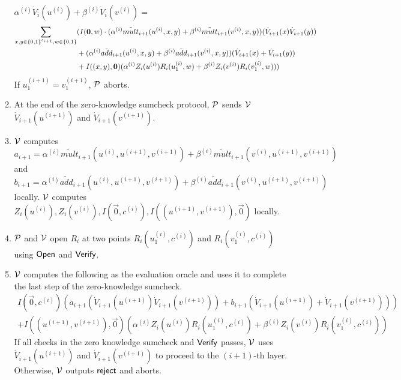 \begin{mdframed}[nobreak=false]
\begin{construction}
\begin{enumerate}
\begin{enumerate}
				$\alpha^{(i)}\dot{V}_i(u^{(i)})+\beta^{(i)}\dot{V}_i(v^{(i)})=$
				\begin{align*}
				\sum_{x, y\in \binary^{s_{i+1}},w \in \binary}&(I(\vec{0},w) \cdot (\alpha^{(i)}\tilde{mult}_{i+1}(u^{(i)}, x, y)+\beta^{(i)}\tilde{mult}_{i+1}(v^{(i)}, x, y))(\dot{V}_{i+1}(x)\dot{V}_{i+1}(y))\\
				&+(\alpha^{(i)}\tilde{add}_{i+1}(u^{(i)}, x, y)+\beta^{(i)}\tilde{add}_{i+1}(v^{(i)}, x, y))(\dot{V}_{i+1}(x)+\dot{V}_{i+1}(y))\nonumber\\
				&+ I((x, y), \vec{0})(\alpha^{(i)}Z_i(u^{(i)})R_i(u_1^{(i)}, w)+\beta^{(i)}Z_i(v^{(i)})R_i(v_1^{(i)}, w)))
				\end{align*}
				If $u_1^{(i+1)} = v_1^{(i+1)}$, $\P$ aborts.
				
				\item At the end of the zero-knowledge sumcheck protocol, $\P$ sends $\V$ $\dot{V}_{i+1}(u^{(i+1)})$ and $\dot{V}_{i+1}(v^{(i+1)})$.
				
				\item $\V$ computes $a_{i+1} = \alpha^{(i)}\tilde{mult}_{i+1}(u^{(i)}, u^{(i+1)}, v^{(i+1)})+\beta^{(i)}\tilde{mult}_{i+1}(v^{(i)}, u^{(i+1)}, v^{(i+1)})$ and $b_{i+1} = \alpha^{(i)}\tilde{add}_{i+1}(u^{(i)}, u^{(i+1)}, v^{(i+1)})+\beta^{(i)}\tilde{add}_{i+1}(v^{(i)}, u^{(i+1)}, v^{(i+1)})$ locally. $\V$ computes $Z_i(u^{(i)}),Z_i(v^{(i)}),I(\vec{0},c^{(i)}), I((u^{(i+1)},v^{(i+1)}),\vec{0})$ locally.
				\item $\P$ and $\V$ open $R_i$ at two points $R_i(u_1^{(i)},c^{(i)})$ and $R_i(v_1^{(i)},c^{(i)})$ using $\Open$ and $\Verify$.
				\item $\V$ computes the following as the evaluation oracle and uses it to complete the last step of the zero-knowledge sumcheck.
				\begin{align*}
				I(\vec{0},c^{(i)})(a_{i+1}(\dot{V}_{i+1}(u^{(i+1)})\dot{V}_{i+1}(v^{(i+1)}))+b_{i+1}(\dot{V}_{i+1}(u^{(i+1)})+\dot{V}_{i+1}(v^{(i+1)})))\\
				+I((u^{(i+1)},v^{(i+1)}),\vec{0})(\alpha^{(i)}Z_i(u^{(i)})R_i(u_1^{(i)}, c^{(i)})+\beta^{(i)}Z_i(v^{(i)})R_i(v_1^{(i)}, c^{(i)}))
				\end{align*}
				If all checks in the zero knowledge sumcheck and $\Verify$ passes, $\V$ uses $\dot{V}_{i+1}(u^{(i+1)})$ and $\dot{V}_{i+1}(v^{(i+1)})$ to proceed to the $(i+1)$-th layer. Otherwise, $\V$ outputs $\reject$ and aborts.
				
			\end{enumerate}
			

\end{enumerate}
\end{construction}
\end{mdframed}
